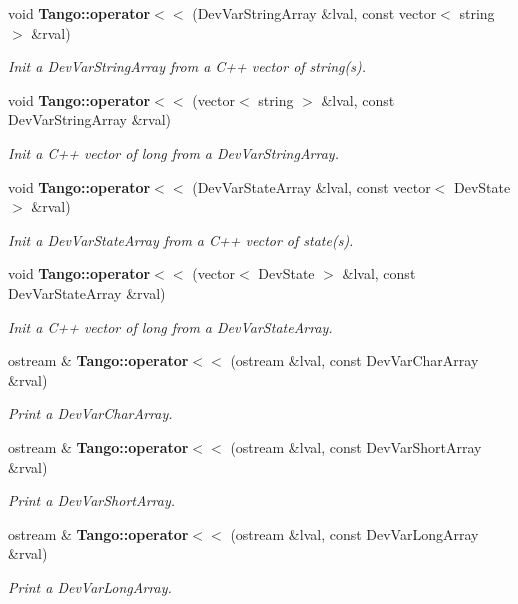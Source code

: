 \begin{DoxyCompactItemize}
void {\bf Tango\-::operator$<$$<$} (Dev\-Var\-String\-Array \&lval, const vector$<$ string $>$ \&rval)
\begin{DoxyCompactList}\small\item\em Init a Dev\-Var\-String\-Array from a C++ vector of string(s). \end{DoxyCompactList}\item 
void {\bf Tango\-::operator$<$$<$} (vector$<$ string $>$ \&lval, const Dev\-Var\-String\-Array \&rval)
\begin{DoxyCompactList}\small\item\em Init a C++ vector of long from a Dev\-Var\-String\-Array. \end{DoxyCompactList}\item 
void {\bf Tango\-::operator$<$$<$} (Dev\-Var\-State\-Array \&lval, const vector$<$ Dev\-State $>$ \&rval)
\begin{DoxyCompactList}\small\item\em Init a Dev\-Var\-State\-Array from a C++ vector of state(s). \end{DoxyCompactList}\item 
void {\bf Tango\-::operator$<$$<$} (vector$<$ Dev\-State $>$ \&lval, const Dev\-Var\-State\-Array \&rval)
\begin{DoxyCompactList}\small\item\em Init a C++ vector of long from a Dev\-Var\-State\-Array. \end{DoxyCompactList}\item 
ostream \& {\bf Tango\-::operator$<$$<$} (ostream \&lval, const Dev\-Var\-Char\-Array \&rval)
\begin{DoxyCompactList}\small\item\em Print a Dev\-Var\-Char\-Array. \end{DoxyCompactList}\item 
ostream \& {\bf Tango\-::operator$<$$<$} (ostream \&lval, const Dev\-Var\-Short\-Array \&rval)
\begin{DoxyCompactList}\small\item\em Print a Dev\-Var\-Short\-Array. \end{DoxyCompactList}\item 
ostream \& {\bf Tango\-::operator$<$$<$} (ostream \&lval, const Dev\-Var\-Long\-Array \&rval)
\begin{DoxyCompactList}\small\item\em Print a Dev\-Var\-Long\-Array. \end{DoxyCompactList}\item 

\end{DoxyCompactItemize}
